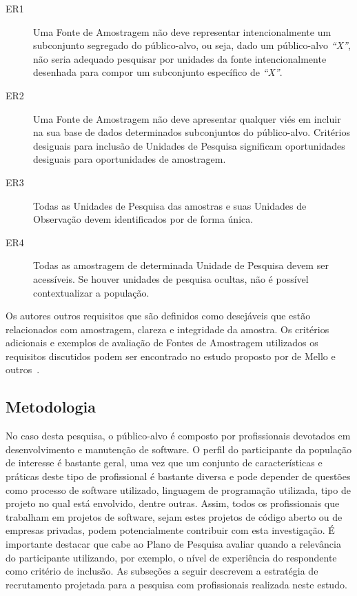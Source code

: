 \begin{description}
	\item[ER1] Uma Fonte de Amostragem não deve representar intencionalmente um
		subconjunto segregado do público-alvo, ou seja, dado um público-alvo
		\textit{``X''}, não seria adequado pesquisar por unidades da fonte
		intencionalmente desenhada para compor um subconjunto específico de
		\textit{``X''}.
	\item[ER2] Uma Fonte de Amostragem não deve apresentar qualquer viés em
		incluir na sua base de dados determinados subconjuntos do público-alvo.
		Critérios desiguais para inclusão de Unidades de Pesquisa significam
		oportunidades desiguais para oportunidades de amostragem.
	\item[ER3] Todas as Unidades de Pesquisa das amostras e suas Unidades de
		Observação devem identificados por de forma única.
	\item[ER4] Todas as amostragem de determinada Unidade de Pesquisa devem ser
		acessíveis. Se houver unidades de pesquisa ocultas, não é possível
		contextualizar a população.
\end{description}

Os autores outros requisitos que são definidos como desejáveis que estão
relacionados com amostragem, clareza e integridade da amostra. Os critérios
adicionais e exemplos de avaliação de Fontes de Amostragem utilizados os
requisitos discutidos podem ser encontrado no estudo proposto por de Mello e
outros~\cite{de2014towards}.

\subsection{Metodologia}

No caso desta pesquisa, o público-alvo é composto por profissionais devotados em
desenvolvimento e manutenção de software. O perfil do participante da população
de interesse é bastante geral, uma vez que um conjunto de características e
práticas deste tipo de profissional é bastante diversa e pode depender de
questões como processo de software utilizado, linguagem de programação
utilizada, tipo de projeto no qual está envolvido, dentre outras. Assim, todos
os profissionais que trabalham em projetos de software, sejam estes projetos de
código aberto ou de empresas privadas, podem potencialmente contribuir com esta
investigação. É importante destacar que cabe ao Plano de Pesquisa avaliar quando
a relevância do participante utilizando, por exemplo, o nível de experiência do
respondente como critério de inclusão. As subseções a seguir descrevem a
estratégia de recrutamento projetada para a pesquisa com profissionais
realizada neste estudo.

